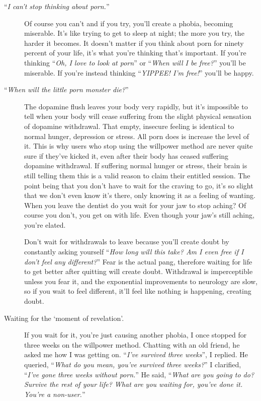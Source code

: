 \documentclass[
]{book}
\begin{document}
\begin{description}
\begin{description}
\item[``\emph{I can't stop thinking about porn.}'']
Of course you can't and if you try, you'll create a phobia, becoming miserable. It's like trying to get to sleep at night; the more you try, the harder it becomes. It doesn't matter if you think about porn for ninety percent of your life, it's what you're thinking that's important. If you're thinking ``\emph{Oh, I love to look at porn}'' or ``\emph{When will I be free?}'' you'll be miserable. If you're instead thinking ``\emph{YIPPEE! I'm free!}'' you'll be happy.
\item[``\emph{When will the little porn monster die?}'']
The dopamine flush leaves your body very rapidly, but it's impossible to tell when your body will cease suffering from the slight physical sensation of dopamine withdrawal. That empty, insecure feeling is identical to normal hunger, depression or stress. All porn does is increase the level of it. This is why users who stop using the willpower method are never quite sure if they've kicked it, even after their body has ceased suffering dopamine withdrawal. If suffering normal hunger or stress, their brain is still telling them this is a valid reason to claim their entitled session. The point being that you don't have to wait for the craving to go, it's so slight that we don't even know it's there, only knowing it as a feeling of wanting. When you leave the dentist do you wait for your jaw to stop aching? Of course you don't, you get on with life. Even though your jaw's still aching, you're elated.

Don't wait for withdrawals to leave because you'll create doubt by constantly asking yourself ``\emph{How long will this take? Am I even free if I don't feel any different?}'' Fear is the actual pang, therefore waiting for life to get better after quitting will create doubt. Withdrawal is imperceptible unless you fear it, and the exponential improvements to neurology are slow, so if you wait to feel different, it'll feel like nothing is happening, creating doubt.
\item[Waiting for the `moment of revelation'.]
If you wait for it, you're just causing another phobia, I once stopped for three weeks on the willpower method. Chatting with an old friend, he asked me how I was getting on.
``\emph{I've survived three weeks}'', I replied.
He queried, ``\emph{What do you mean, you've survived three weeks?}''
I clarified, ``\emph{I've gone three weeks without porn.}''
He said, ``\emph{What are you going to do? Survive the rest of your life? What are you waiting for, you've done it. You're a non-user.}''


\end{description}
\end{description}
\end{document}
